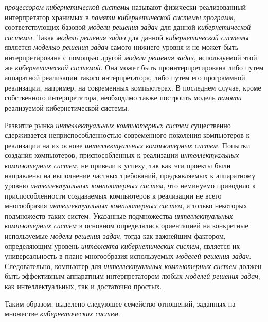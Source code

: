
\textit{процессором кибернетической системы} называют физически реализованный интерпретатор хранимых в \textit{памяти кибернетической системы} \textit{программ}, соответствующих базовой \textit{модели решения задач} для данной \textit{кибернетической системы}. Такая \textit{модель решения задач} для данной \textit{кибернетической системы} является \textit{моделью решения задач} самого нижнего уровня и не может быть интерпретирована с помощью другой \textit{модели решения задач}, используемой этой же \textit{кибернетической системой}. Она может быть проинтерпретирована либо путем аппаратной реализации такого интерпретатора, либо путем его программной реализации, например, на современных компьютерах. В последнем случае, кроме собственного интерпретатора, необходимо также построить модель \textit{памяти} реализуемой {кибернетической системы}.

Развитие рынка \textit{интеллектуальных компьютерных систем} существенно сдерживается неприспособленностью современного поколения компьютеров к реализации на их основе \textit{интеллектуальных компьютерных систем}. Попытки создания компьютеров, приспособленных к реализации \textit{интеллектуальных компьютерных систем}, не привели к успеху, так как эти проекты были направлены на выполнение частных требований, предъявляемых к аппаратному уровню \textit{интеллектуальных компьютерных систем}, что неминуемо приводило к приспособленности создаваемых компьютеров к реализации не всего многообразия \textit{интеллектуальных компьютерных систем}, а только некоторых подмножеств таких систем. Указанные подмножества \textit{интеллектуальных компьютерных систем} в основном определялись ориентацией на конкретные используемые \textit{модели решения задач}, тогда как важнейшим фактором, определяющим уровень \textit{интеллекта кибернетических систем}, является их универсальность в плане многообразия используемых \textit{моделей решения задач}. Следовательно, компьютер для \textit{интеллектуальных компьютерных систем} должен быть эффективным аппаратным интерпретатором любых \textit{моделей решения задач}, как интеллектуальных, так и достаточно простых.

Таким образом, выделено следующее семейство отношений, заданных на множестве \textit{кибернетических систем}.

\begin{SCn}
\begin{scnindent}
\end{scnindent}
\end{SCn}

